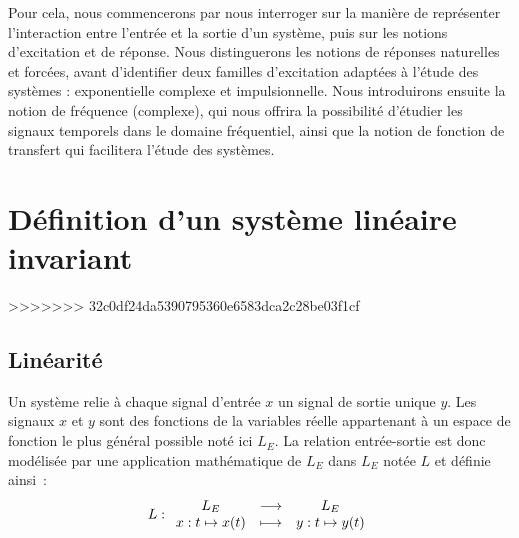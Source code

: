 Pour cela, nous commencerons par nous interroger sur la manière de
représenter l'interaction entre l'entrée et la sortie d'un système,
puis sur les notions d'excitation et de réponse. Nous distinguerons
les notions de réponses naturelles et forcées, avant d'identifier deux
familles d'excitation adaptées à l'étude des systèmes : exponentielle
complexe et impulsionnelle. Nous introduirons ensuite la notion de
fréquence (complexe), qui nous offrira la possibilité d'étudier les
signaux temporels dans le domaine fréquentiel, ainsi que la notion de
fonction de transfert qui facilitera l'étude des systèmes.
	
	
\section{Définition d'un système linéaire invariant}
>>>>>>> 32c0df24da5390795360e6583dca2c28be03f1cf

	\subsection{Linéarité} 
	Un système relie à chaque signal d'entrée $x$ un signal de
        sortie unique $y$. Les signaux $x$ et $y$ sont des fonctions
        de la variables réelle appartenant à un espace de fonction le
        plus général possible noté ici $L_E$. La relation
        entrée-sortie est donc modélisée par une application
        mathématique de $L_E$ dans $L_E$ notée $L$ et définie ainsi~:
	\begin{equation}
          L : \begin{array}{ccc} L_E & \longrightarrow & L_E \\ x : t\mapsto x(t) & \longmapsto & y : t\mapsto y(t) \\ \end{array} 
	\end{equation}

